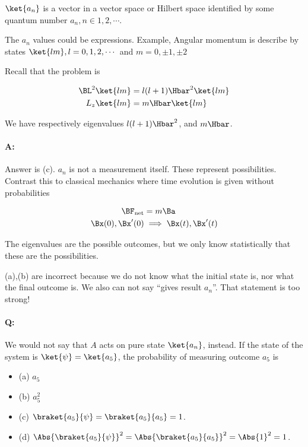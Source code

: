 $\ket{a_n}$ is a vector in a vector space or Hilbert space identified by some quantum number $a_n, n \in 1,2, \cdots$.

The $a_n$ values could be expressions.  Example, Angular momentum is describe by states $\ket{lm}, l = 0,1,2,\cdots$ and $m = 0, \pm 1, \pm 2$

Recall that the problem is

\begin{equation}\label{eqn:PHY356HNov2:10}
\begin{aligned}
\BL^2 \ket{lm} &= l(l+1) \Hbar^2 \ket{lm} \\
L_z \ket{lm} &= m \Hbar \ket{lm}
\end{aligned}
\end{equation}

We have respectively eigenvalues $l(l+1)\Hbar^2$, and $m \Hbar$.

\paragraph{A:} Answer is (c).  $a_n$ is not a measurement itself.  These represent possibilities.  Contrast this to classical mechanics where time evolution is given without probabilities

\begin{equation}\label{eqn:PHY356HNov2:20}
\begin{aligned}
\BF_{\text{net}} &= m \Ba \\
\Bx(0), \Bx'(0) &\implies \Bx(t), \Bx'(t)
\end{aligned}
\end{equation}

The eigenvalues are the possible outcomes, but we only know statistically that these are the possibilities.

(a),(b) are incorrect because we do not know what the initial state is, nor what the final outcome is.  We also can not say ``gives result $a_n$''.  That statement is too strong!

\paragraph{Q:} We would not say that $A$ acts on pure state $\ket{a_n}$, instead.  If the state of the system is $\ket{\psi} = \ket{a_5}$, the probability of measuring outcome $a_5$ is
\begin{itemize}
\item (a) $a_5$
\item (b) $a_5^2$
\item (c) $\braket{a_5}{\psi} = \braket{a_5}{a_5} = 1$.
\item (d) $\Abs{\braket{a_5}{\psi}}^2 = \Abs{\braket{a_5}{a_5}}^2 = \Abs{1}^2 = 1$.
\end{itemize}

